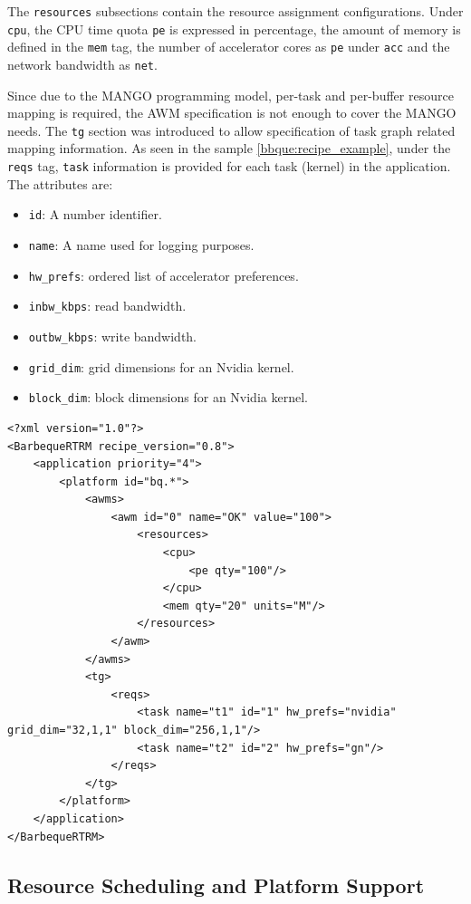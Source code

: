 The \texttt{resources} subsections contain the resource assignment configurations. Under \texttt{cpu}, the CPU time quota \texttt{pe} is expressed in percentage, the amount of memory is defined in the \texttt{mem} tag, the number of accelerator cores as \texttt{pe} under \texttt{acc} and the network bandwidth as \texttt{net}.

Since due to the MANGO programming model, per-task and per-buffer resource mapping is required, the AWM specification is not enough to cover the MANGO needs. The \texttt{tg} section was introduced to allow specification of task graph related mapping information.
As seen in the sample \ref{bbque:recipe_example}, under the \texttt{reqs} tag, \texttt{task} information is provided for each task (kernel) in the application. The attributes are:

\begin{itemize}
    \item \texttt{id}: A number identifier.
    \item \texttt{name}: A name used for logging purposes.
    \item \texttt{hw\_prefs}: ordered list of accelerator preferences.
    \item \texttt{inbw\_kbps}: read bandwidth.
    \item \texttt{outbw\_kbps}: write bandwidth.
    \item \texttt{grid\_dim}: grid dimensions for an Nvidia kernel.
    \item \texttt{block\_dim}: block dimensions for an Nvidia kernel.
\end{itemize}

\begin{lstlisting}[style=CStyle, label=bbque:recipe_example, caption=BarbequeRTRM Recipe file - Saxpy Sample in GN and Nvidia]
<?xml version="1.0"?>
<BarbequeRTRM recipe_version="0.8">
	<application priority="4">
		<platform id="bq.*">
			<awms>
				<awm id="0" name="OK" value="100">
					<resources>
						<cpu>
							<pe qty="100"/>
						</cpu>
						<mem qty="20" units="M"/>
					</resources>
				</awm>
			</awms>
			<tg>
				<reqs>
					<task name="t1" id="1" hw_prefs="nvidia" grid_dim="32,1,1" block_dim="256,1,1"/>
					<task name="t2" id="2" hw_prefs="gn"/>
				</reqs>
			</tg>
		</platform>
	</application>
</BarbequeRTRM>
\end{lstlisting}

\subsection{Resource Scheduling and Platform Support}

